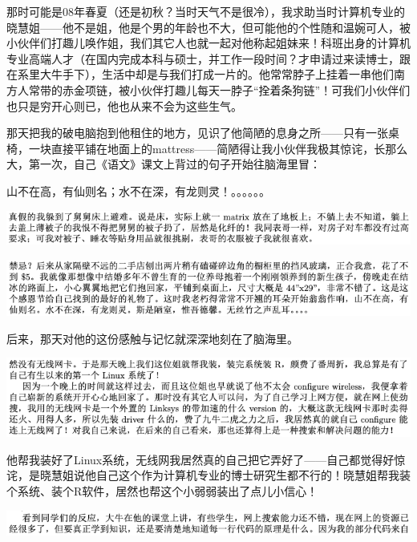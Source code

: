 \documentclass[9pt, b5paper]{article}
\begin{document}
那时可能是08年春夏（还是初秋？当时天气不是很冷），我求助当时计算机专业的晓慧姐——他不是姐，他是个男的年龄也不大，但可能他的个性随和温婉可人，被小伙伴们打趣儿唤作姐，我们其它人也就一起对他称起姐妹来！科班出身的计算机专业高端人才（在国内完成本科与硕士，并工作一段时间？才申请过来读博士，跟在系里大牛手下），生活中却是与我们打成一片的。他常常脖子上挂着一串他们南方人常带的赤金项链，被小伙伴打趣儿每天一脖子“拴着条狗链”！可我们小伙伴们也只是穷开心则已，他也从来不会为这些生气。

那天把我的破电脑抱到他租住的地方，见识了他简陋的息身之所——只有一张桌椅，一块直接平铺在地面上的mattress——简陋得让我小伙伴我极其惊诧，长那么大，第一次，自己《语文》课文上背过的句子开始往脑海里冒：

山不在高，有仙则名；水不在深，有龙则灵！。。。。。。

\begin{center}
\includegraphics[width=.9\linewidth]{./pic/backups_plans_20210422_092547.png}
\end{center}

\begin{center}
\includegraphics[width=.9\linewidth]{./pic/backups_plans_20210422_092432.png}
\end{center}

后来，那天对他的这份感触与记忆就深深地刻在了脑海里。 

\begin{center}
\includegraphics[width=.9\linewidth]{./pic/backups_plans_20210425_104206.png}
\end{center}

他帮我装好了Linux系统，无线网我居然真的自己把它弄好了——自己都觉得好惊诧，是晓慧姐说他自己这个作为计算机专业的博士研究生都不行的！晓慧姐帮我装个系统、装个R软件，居然也帮这个小弱弱装出了点儿小信心！

\begin{center}
\includegraphics[width=.9\linewidth]{./pic/backups_plans_20210425_110440.png}
\end{center}
\end{document}
